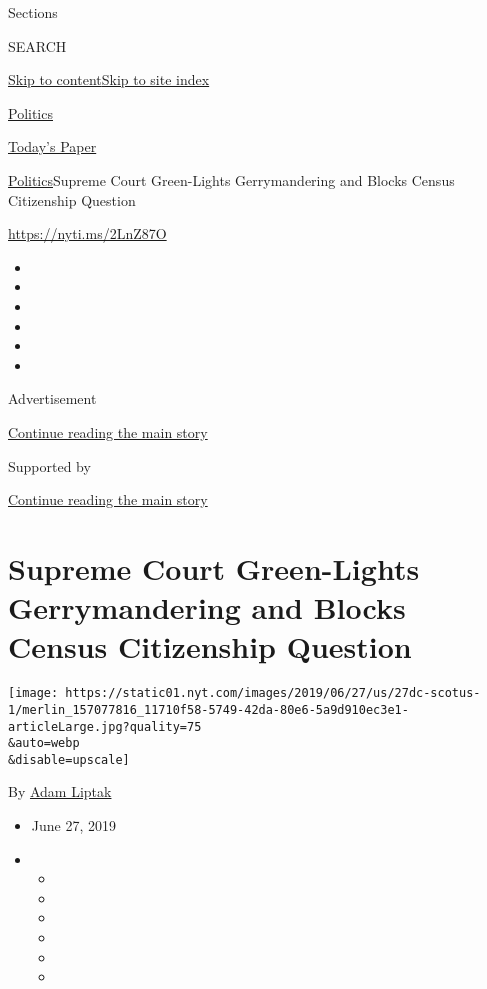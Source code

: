 Sections

SEARCH

\protect\hyperlink{site-content}{Skip to
content}\protect\hyperlink{site-index}{Skip to site index}

\href{https://www.nytimes.com/section/politics}{Politics}

\href{https://myaccount.nytimes.com/auth/login?response_type=cookie\&client_id=vi}{}

\href{https://www.nytimes.com/section/todayspaper}{Today's Paper}

\href{/section/politics}{Politics}\textbar{}Supreme Court Green-Lights
Gerrymandering and Blocks Census Citizenship Question

\url{https://nyti.ms/2LnZ87O}

\begin{itemize}
\item
\item
\item
\item
\item
\item
\end{itemize}

Advertisement

\protect\hyperlink{after-top}{Continue reading the main story}

Supported by

\protect\hyperlink{after-sponsor}{Continue reading the main story}

\hypertarget{supreme-court-green-lights-gerrymandering-and-blocks-census-citizenship-question}{%
\section{Supreme Court Green-Lights Gerrymandering and Blocks Census
Citizenship
Question}\label{supreme-court-green-lights-gerrymandering-and-blocks-census-citizenship-question}}

\texttt{[image: https://static01.nyt.com/images/2019/06/27/us/27dc-scotus-1/merlin\_157077816\_11710f58-5749-42da-80e6-5a9d910ec3e1-articleLarge.jpg?quality=75\\\&auto=webp\\\&disable=upscale]}

By \href{https://www.nytimes.com/by/adam-liptak}{Adam Liptak}

\begin{itemize}
\item
  June 27, 2019
\item
  \begin{itemize}
  \item
  \item
  \item
  \item
  \item
  \item
  \end{itemize}
\end{itemize}

